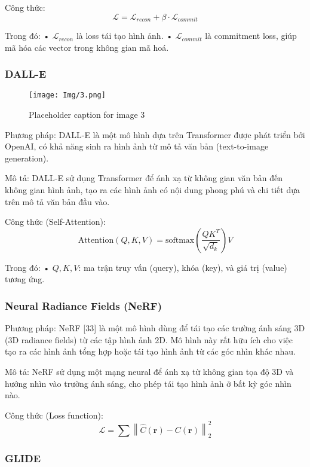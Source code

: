 \documentclass[12pt]{report}
\begin{document}
Công thức:  
\[
\mathcal{L} = \mathcal{L}_{recon} + \beta \cdot \mathcal{L}_{commit}
\]

Trong đó:  
• \( \mathcal{L}_{recon} \) là loss tái tạo hình ảnh.  
• \( \mathcal{L}_{commit} \) là commitment loss, giúp mã hóa các vector trong không gian mã hoá.  

\subsubsection{DALL-E}

\vspace{1em}
\begin{figure}[H]
    \centering
    \texttt{[image: Img/3.png]}
    \caption{Placeholder caption for image 3}
    \label{fig:3}
\end{figure}
\vspace{0.5em}

Phương pháp:  
DALL-E là một mô hình dựa trên Transformer được phát triển bởi OpenAI, có khả năng sinh ra hình ảnh từ mô tả văn bản (text-to-image generation).

Mô tả:  
DALL-E sử dụng Transformer để ánh xạ từ không gian văn bản đến không gian hình ảnh, tạo ra các hình ảnh có nội dung phong phú và chi tiết dựa trên mô tả văn bản đầu vào.

Công thức (Self-Attention):
\[
\text{Attention}(Q, K, V) = \text{softmax} \left( \frac{QK^T}{\sqrt{d_k}} \right) V
\]

Trong đó:  
• \( Q, K, V \): ma trận truy vấn (query), khóa (key), và giá trị (value) tương ứng.

\subsubsection{Neural Radiance Fields (NeRF)}

Phương pháp:  
NeRF [33] là một mô hình dùng để tái tạo các trường ánh sáng 3D (3D radiance fields) từ các tập hình ảnh 2D. Mô hình này rất hữu ích cho việc tạo ra các hình ảnh tổng hợp hoặc tái tạo hình ảnh từ các góc nhìn khác nhau.  

Mô tả:  
NeRF sử dụng một mạng neural để ánh xạ từ không gian tọa độ 3D và hướng nhìn vào trường ánh sáng, cho phép tái tạo hình ảnh ở bất kỳ góc nhìn nào.

Công thức (Loss function):
\[
\mathcal{L} = \sum \left\| \hat{C}(\mathbf{r}) - C(\mathbf{r}) \right\|_2^2
\]

\subsubsection{GLIDE}
\end{document}
